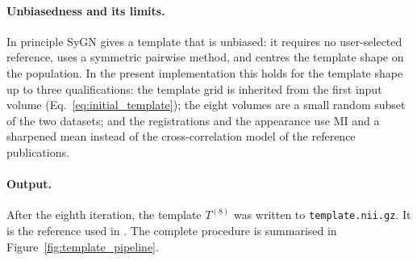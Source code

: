 \paragraph{Unbiasedness and its limits.}  %
In principle SyGN gives a template that is unbiased: it requires no
user-selected reference, uses a symmetric pairwise method, and centres the
template shape on the population. In the present implementation this holds for
the template shape up to three qualifications: the template grid is inherited
from the first input volume (Eq.~\eqref{eq:initial_template}); the eight volumes
are a small random subset of the two datasets; and the registrations and the
appearance use MI and a sharpened mean instead of the cross-correlation model of
the reference publications.

\paragraph{Output.}  %
After the eighth iteration, the template $T^{(8)}$ was written to
\texttt{template.nii.gz}. It is the reference used in
. The complete procedure is summarised in
Figure~\ref{fig:template_pipeline}.

